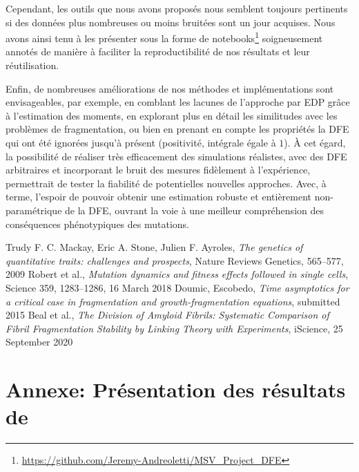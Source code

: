 \documentclass[12pt]{article}
\newcounter{prop}[section]
\begin{document}
  Cependant, les outils que nous avons proposés nous semblent toujours pertinents si des données plus nombreuses ou moins bruitées sont un jour acquises. Nous avons ainsi tenu à les présenter sous la forme de notebooks\footnote{\url{https://github.com/Jeremy-Andreoletti/MSV_Project_DFE}} soigneusement annotés de manière à faciliter la reproductibilité de nos résultats et leur réutilisation.
  
  Enfin, de nombreuses améliorations de nos méthodes et implémentations sont envisageables, par exemple, en comblant les lacunes de l'approche par EDP grâce à l'estimation des moments, en explorant plus en détail les similitudes avec les problèmes de fragmentation, ou bien en prenant en compte les propriétés la DFE qui ont été ignorées jusqu'à présent (positivité, intégrale égale à $1$). À cet égard, la possibilité de réaliser très efficacement des simulations réalistes, avec des DFE arbitraires et incorporant le bruit des mesures fidèlement à l'expérience, permettrait de tester la fiabilité de potentielles nouvelles approches. Avec, à terme, l'espoir de pouvoir obtenir une estimation robuste et entièrement non-paramétrique de la DFE, ouvrant la voie à une meilleur compréhension des conséquences phénotypiques des mutations.
  
\newpage

\begin{thebibliography}{1}

  Trudy F. C. Mackay, Eric A. Stone, Julien F. Ayroles,
  \emph{The genetics of quantitative traits: challenges and prospects}, Nature Reviews Genetics, 565–577, 2009
  Robert et al.,
  \emph{Mutation dynamics and fitness effects followed in single cells}, Science 359, 1283–1286, 16 March 2018
  Doumic, Escobedo,
  \emph{Time asymptotics for a critical case in fragmentation and growth-fragmentation equations}, submitted 2015
  Beal et al.,
  \emph{The Division of Amyloid Fibrils: Systematic Comparison of Fibril Fragmentation Stability by Linking Theory with Experiments}, iScience, 25 September 2020
\end{thebibliography}





\newpage

\appendix

\FloatBarrier
\section{Annexe: Présentation des résultats de \cite{rob}}\label{ann:resultats}
\end{document}
